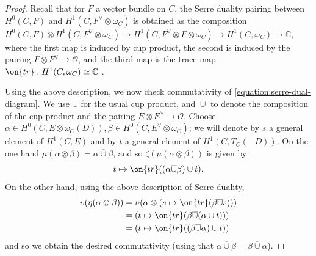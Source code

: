 \documentclass[12 pt]{amsart}
\theoremstyle{plain}
\theoremstyle{definition}
\theoremstyle{remark}
\numberwithin{equation}{section}
\begin{document}
\begin{proof}
	Recall that for $F$ a vector bundle on $C$, the Serre duality pairing
	between $H^0(C, F)$ and $H^1(C, F^\vee\otimes \omega_C)$ is obtained
	as the composition $H^0(C, F) \otimes H^1(C, F^\vee\otimes \omega_C) \to
	H^1(C, F^\vee\otimes F \otimes \omega_C) \to
	H^1(C, \omega_C) \to \mathbb C$, where
	the first map is induced by cup product, the second is induced by the
	pairing
	$F \otimes F^\vee \to \mathscr O$,
	and the third map is the trace
	map $\on{tr}: H^1(C, \omega_C) \simeq \mathbb C$
	\cite[30.3.15]{vakil:foundations-of-algebraic-geometry-2017}.

	Using the above description, we now check commutativity of
	\eqref{equation:serre-dual-diagram}.
	We use $\cup$ for the usual cup product, and $\overline{\cup}$ to denote
	the composition of the cup product and the pairing $E \otimes E^\vee \to
	\mathscr O$. 
		Choose $\alpha \in H^0(C, E \otimes \omega_C(D)), \beta \in
	H^0(C, E^\vee \otimes \omega_C)$; we will denote by $s$ a general element of $H^1(C, E)$ and by $t$ a general element of $H^1(C,
	T_C(-D))$.
	On the one hand $\mu(\alpha \otimes \beta) = \alpha \overline{\cup}\beta$, and so $\zeta(\mu(\alpha\otimes \beta))$ is given by $$t\mapsto \on{tr}((\alpha\overline{\cup}\beta)\cup t).$$
	On the other hand, using the above description of Serre duality,
	\begin{align*}
		\upsilon(\eta(\alpha \otimes \beta))
		&= \upsilon(\alpha \otimes (s \mapsto \on{tr}(\beta
		\overline{\cup}s)))
		\\
		&= \left(t \mapsto \on{tr}(\beta \overline{\cup} (\alpha \cup
			t))\right) \\
			&= \left( t \mapsto \on{tr}( (\beta \overline{\cup} \alpha) \cup
			t )\right)  
	\end{align*}
	and so we obtain the desired commutativity (using that $\alpha \overline{\cup} \beta = \beta \overline{\cup} \alpha$).

\end{proof}
\end{document}
